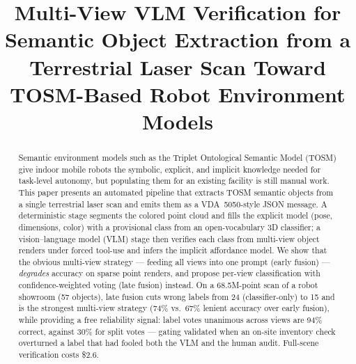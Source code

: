 \documentclass[conference]{IEEEtran}
\begin{document}
\title{Multi-View VLM Verification for Semantic Object Extraction from a
Terrestrial Laser Scan Toward TOSM-Based Robot Environment Models}

\author{
}

\maketitle

\begin{abstract}
Semantic environment models such as the Triplet Ontological Semantic Model
(TOSM) give indoor mobile robots the symbolic, explicit, and implicit
knowledge needed for task-level autonomy, but populating them for an
existing facility is still manual work. This paper presents an automated
pipeline that extracts TOSM semantic objects from a single terrestrial
laser scan and emits them as a VDA~5050-style JSON message. A deterministic
stage segments the colored point cloud and fills the explicit model (pose,
dimensions, color) with a provisional class from an open-vocabulary 3D
classifier; a vision--language model (VLM) stage then verifies each class
from multi-view object renders under forced tool-use and infers the
implicit affordance model. We show that the obvious multi-view strategy ---
feeding all views into one prompt (early fusion) --- \emph{degrades}
accuracy on sparse point renders, and propose per-view classification with
confidence-weighted voting (late fusion) instead. On a 68.5M-point scan of
a robot showroom (57 objects), late fusion cuts wrong labels from 24
(classifier-only) to 15 and is the strongest multi-view strategy (74\% vs.\
67\% lenient accuracy over early fusion), while providing a free
reliability signal: label votes unanimous across views are 94\% correct,
against 30\% for split votes --- gating validated when an on-site
inventory check overturned a label that had fooled both the VLM and the
human audit. Full-scene verification costs \$2.6.
\end{abstract}
\end{document}
